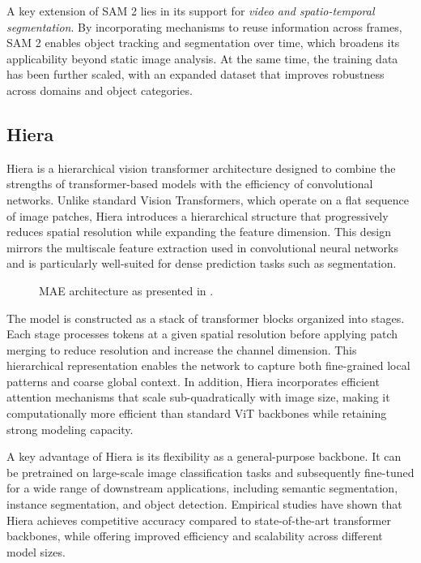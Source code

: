 A key extension of SAM 2 lies in its support for \textit{video and spatio-temporal segmentation}. By incorporating mechanisms to reuse information across frames, SAM 2 enables object tracking and segmentation over time, which broadens its applicability beyond static image analysis. At the same time, the training data has been further scaled, with an expanded dataset that improves robustness across domains and object categories. 


\subsection{Hiera}
Hiera is a hierarchical vision transformer architecture designed to combine the strengths of transformer-based models with the efficiency of convolutional networks. Unlike standard Vision Transformers, which operate on a flat sequence of image patches, Hiera introduces a hierarchical structure that progressively reduces spatial resolution while expanding the feature dimension. This design mirrors the multiscale feature extraction used in convolutional neural networks and is particularly well-suited for dense prediction tasks such as segmentation. 

\begin{figure}[!ht]
    \centering
    \caption{MAE architecture as presented in \cite{LeCun.1989}.}
    \label{fig:Hiera}
\end{figure}

The model is constructed as a stack of transformer blocks organized into stages. Each stage processes tokens at a given spatial resolution before applying patch merging to reduce resolution and increase the channel dimension. This hierarchical representation enables the network to capture both fine-grained local patterns and coarse global context. In addition, Hiera incorporates efficient attention mechanisms that scale sub-quadratically with image size, making it computationally more efficient than standard ViT backbones while retaining strong modeling capacity. 

A key advantage of Hiera is its flexibility as a general-purpose backbone. It can be pretrained on large-scale image classification tasks and subsequently fine-tuned for a wide range of downstream applications, including semantic segmentation, instance segmentation, and object detection. Empirical studies have shown that Hiera achieves competitive accuracy compared to state-of-the-art transformer backbones, while offering improved efficiency and scalability across different model sizes. 







